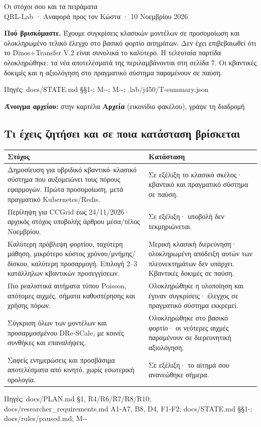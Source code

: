 \documentclass[10pt,a4paper]{article}
\newcommand{\src}[1]{\par{\scriptsize\color{gray}Πηγές: {\ttfamily #1}}\par}
\begin{document}
\begin{center}{\LARGE Οι στόχοι σου και τα πειράματα}\\[5pt]{\large QRL-Lab · Αναφορά προς τον Κώστα · 10 Νοεμβρίου 2026}\end{center}
\textbf{Πού βρισκόμαστε.} Έχουμε συγκρίσεις κλασικών μοντέλων σε προσομοίωση και ολοκληρωμένο τελικό έλεγχο στο βασικό φορτίο αιτημάτων. Δεν έχει επιβεβαιωθεί ότι το Dinos+Transfer V.2 είναι συνολικά το καλύτερο. Η τελευταία παρτίδα ολοκληρώθηκε: τα νέα αποτελέσματά της περιλαμβάνονται στη σελίδα 7. Οι κβαντικές δοκιμές και η αξιολόγηση στο πραγματικό σύστημα παραμένουν σε παύση.
\src{docs/\allowbreak STATE.md §§1-; M-\allowbreak 20261109-\allowbreak 040; M-\allowbreak 20261110-\allowbreak 017; .lab/\allowbreak j450/\allowbreak T-\allowbreak summary.json}
\textbf{Άνοιγμα αρχείου:} στην καρτέλα \textbf{Αρχεία} (εικονίδιο φακέλου), γράψε τη διαδρομή\\
{\small\texttt{}}
\subsection*{Τι έχεις ζητήσει και σε ποια κατάσταση βρίσκεται}
\begin{tabular}{p{10.6cm}p{4.6cm}}\toprule
Στόχος & Κατάσταση\\\midrule
Δημοσίευση για υβριδικό κβαντικό--κλασικό σύστημα που αυξομειώνει τους πόρους εφαρμογών. Πρώτα προσομοίωση, μετά πραγματικό Kubernetes/Redis. & Σε εξέλιξη το κλασικό σκέλος· κβαντικό και πραγματικό σύστημα σε παύση.\\
Περίληψη για CCGrid έως 24/11/2026· αρχικός στόχος υποβολής άρθρου μέσα/τέλος Νοεμβρίου. & Σε εξέλιξη· υποβολή δεν τεκμηριώνεται.\\
Καλύτερη πρόβλεψη φορτίου, ταχύτερη μάθηση, μικρότερο κόστος χρόνου/μνήμης/δίσκου, καλύτερη προσαρμογή. Επιλογή 2--3 κατάλληλων κβαντικών προσεγγίσεων. & Μερική κλασική διερεύνηση· ολοκληρωμένη απόδειξη αυτών των πλεονεκτημάτων δεν υπάρχει. Κβαντικές δοκιμές σε παύση.\\
Πιο ρεαλιστικά αιτήματα τύπου Poisson, απότομες αιχμές, σήματα καθυστέρησης και χρήσης πόρων. & Ολοκληρώθηκε η υλοποίηση και έγιναν συγκρίσεις· έλεγχος σε πραγματικό σύστημα εκκρεμεί.\\
Σύγκριση όλων των μοντέλων και προσαρμοσμένου DRe-SCale, με κοινές συνθήκες και επαναλήψεις. & Ολοκληρώθηκε στο βασικό φορτίο· οι νεότερες αιχμές παραμένουν σε διερευνητική αξιολόγηση.\\
Σαφείς ενημερώσεις και προσβάσιμα αποτελέσματα από κινητό, χωρίς εσωτερική ορολογία. & Σε εξέλιξη· το αίτημά σου ανανεώθηκε σήμερα.\\\bottomrule
\end{tabular}
\src{docs/\allowbreak PLAN.md §1, R4/\allowbreak R6/\allowbreak R7/\allowbreak R8/\allowbreak R10; docs/\allowbreak researcher\_requirements.md A1-\allowbreak A7, B8, D4, F1-\allowbreak F2; docs/\allowbreak STATE.md §§1-\allowbreak 3; docs/\allowbreak rules/\allowbreak paused.md; M-\allowbreak 20261110-\allowbreak 018}
\end{document}
